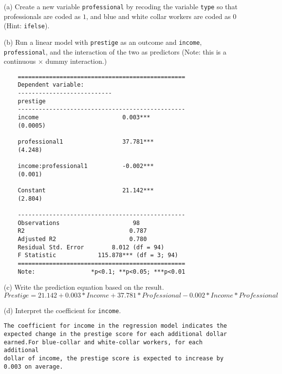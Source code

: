 \documentclass[12pt,letterpaper]{article}
\begin{document}
\newpage
\begin{enumerate}
	
	\item [(a)]
	Create a new variable \texttt{professional} by recoding the variable \texttt{type} so that professionals are coded as $1$, and blue and white collar workers are coded as $0$ (Hint: \texttt{ifelse}).
	
	
	\item [(b)]
	Run a linear model with \texttt{prestige} as an outcome and \texttt{income}, \texttt{professional}, and the interaction of the two as predictors (Note: this is a continuous $\times$ dummy interaction.)
	
	\begin{footnotesize}
	\begin{verbatim}
	================================================
	Dependent variable:    
	---------------------------
	prestige          
	------------------------------------------------
	income                        0.003***          
	(0.0005)          
	
	professional1                 37.781***         
	(4.248)          
	
	income:professional1          -0.002***         
	(0.001)          
	
	Constant                      21.142***         
	(2.804)          
	
	------------------------------------------------
	Observations                     98             
	R2                              0.787           
	Adjusted R2                     0.780           
	Residual Std. Error        8.012 (df = 94)      
	F Statistic            115.878*** (df = 3; 94)  
	================================================
	Note:                *p<0.1; **p<0.05; ***p<0.01
	\end{verbatim}
	\end{footnotesize} 

	\item [(c)]
	Write the prediction equation based on the result.
	\begin{equation*}
 Prestige = 21.142 + 0.003*Income + 37.781*Professional - 0.002*Income*Professional 
    \end{equation*}

	\item [(d)]
	Interpret the coefficient for \texttt{income}.
	\begin{verbatim}
The coefficient for income in the regression model indicates the 
expected change in the prestige score for each additional dollar 
earned.For blue-collar and white-collar workers, for each additional 
dollar of income, the prestige score is expected to increase by 
0.003 on average.
	\end{verbatim}
		

\end{enumerate}
\end{document}
